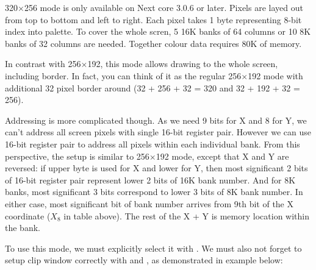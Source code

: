 320$\times$256 mode is only available on Next core 3.0.6 or later. Pixels are layed out from top to bottom and left to right. Each pixel takes 1 byte representing 8-bit index into palette. To cover the whole scren, 5 16K banks of 64 columns or 10 8K banks of 32 columns are needed. Together colour data requires 80K of memory.

In contrast with 256$\times$192, this mode allows drawing to the whole screen, including border. In fact, you can think of it as the regular 256$\times$192 mode with additional 32 pixel border around (32 + 256 + 32 = 320 and 32 + 192 + 32 = 256).

Addressing is more complicated though. As we need 9 bits for X and 8 for Y, we can't address all screen pixels with single 16-bit register pair. However we can use 16-bit register pair to address all pixels within each individual bank. From this perspective, the setup is similar to 256$\times$192 mode, except that X and Y are reversed: if upper byte is used for X and lower for Y, then most significant 2 bits of 16-bit register pair represent lower 2 bits of 16K bank number. And for 8K banks, most significant 3 bits correspond to lower 3 bits of 8K bank number. In either case, most significant bit of bank number arrives from 9th bit of the X coordinate ($X_8$ in table above). The rest of the X + Y is memory location within the bank.

To use this mode, we must explicitly select it with . We must also not forget to setup clip window correctly with  and , as demonstrated in example below:



